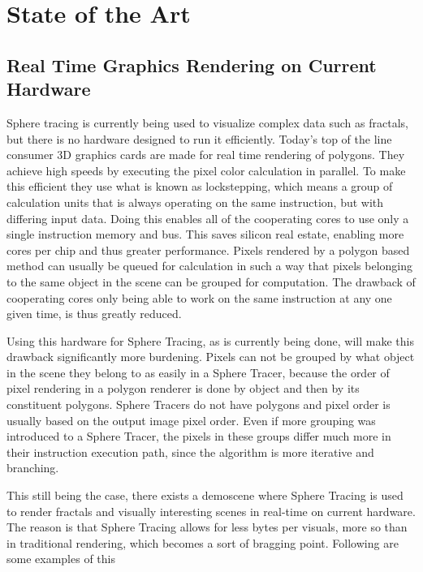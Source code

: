 \chapter{State of the Art}

	\section{ Real Time Graphics Rendering on Current Hardware } 

		Sphere tracing is currently being used to visualize complex data such
		as fractals, but there is no hardware designed to run it efficiently.
		Today's top of the line consumer 3D graphics cards are made for real
		time rendering of polygons. They achieve high speeds by executing the
		pixel color calculation in parallel. To make this efficient they use
		what is known as lockstepping, which means a group of calculation units
		that is always operating on the same instruction, but with differing
		input data. Doing this enables all of the cooperating cores to use only
		a single instruction memory and bus. This saves silicon real estate,
		enabling more cores per chip and thus greater performance.  Pixels
		rendered by a polygon based method can usually be queued for
		calculation in such a way that pixels belonging to the same object in
		the scene can be grouped for computation. The drawback of cooperating
		cores only being able to work on the same instruction at any one given
		time, is thus greatly reduced.
		
		Using this hardware for Sphere Tracing, as is currently being done,
		will make this drawback significantly more burdening. Pixels can not be
		grouped by what object in the scene they belong to as easily in a
		Sphere Tracer, because the order of pixel rendering in a polygon
		renderer is done by object and then by its constituent polygons. Sphere
		Tracers do not have polygons and pixel order is usually based on the
		output image pixel order. Even if more grouping was introduced to a
		Sphere Tracer, the pixels in these groups differ much more in their
		instruction execution path, since the algorithm is more iterative and
		branching.
		
		This still being the case, there exists a demoscene where Sphere
		Tracing is used to render fractals and visually interesting scenes in
		real-time on current hardware. The reason is that Sphere Tracing allows
		for less bytes per visuals, more so than in traditional rendering,
		which becomes a sort of bragging point. Following are some examples of
		this\cite{InigoQuilez}
		
